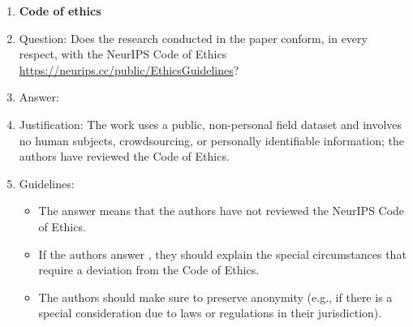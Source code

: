 \begin{enumerate}
\item {\bf Code of ethics}
    \item[] Question: Does the research conducted in the paper conform, in every respect, with the NeurIPS Code of Ethics \url{https://neurips.cc/public/EthicsGuidelines}?
    \item[] Answer: \answerYes{}
    \item[] Justification: The work uses a public, non-personal field dataset and involves no human subjects, crowdsourcing, or personally identifiable information; the authors have reviewed the Code of Ethics.
    \item[] Guidelines:
    \begin{itemize}
        \item The answer \answerNA{} means that the authors have not reviewed the NeurIPS Code of Ethics.
        \item If the authors answer \answerNo, they should explain the special circumstances that require a deviation from the Code of Ethics.
        \item The authors should make sure to preserve anonymity (e.g., if there is a special consideration due to laws or regulations in their jurisdiction).
    \end{itemize}



\end{enumerate}
